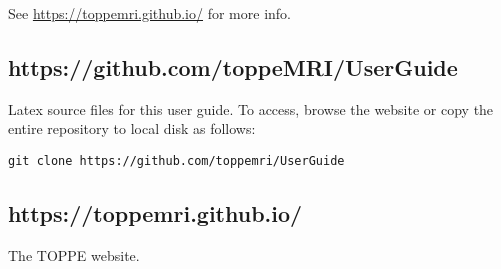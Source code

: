 See \url{https://toppemri.github.io/} for more info.


\subsection{https://github.com/toppeMRI/UserGuide}

Latex source files for this user guide.
To access, browse the website or copy the entire repository to local disk as follows:
\begin{lstlisting}
git clone https://github.com/toppemri/UserGuide
\end{lstlisting}



\subsection{https://toppemri.github.io/}

The TOPPE website.




